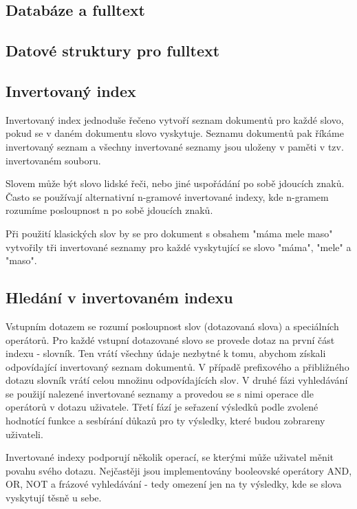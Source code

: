 \documentclass[11pt]{article}
\begin{document}
\subsection{Databáze a fulltext}
\subsection{Datové struktury pro fulltext}

\subsection{Invertovaný index}
Invertovaný index jednoduše řečeno vytvoří seznam dokumentů pro každé slovo,
pokud se v daném dokumentu slovo vyskytuje. Seznamu dokumentů pak říkáme
invertovaný seznam a všechny invertované seznamy jsou uloženy v paměti v tzv.
invertovaném souboru.

Slovem může být slovo lidské řeči, nebo jiné uspořádání po sobě jdoucích znaků.
Často se používají alternativní n-gramové invertované indexy, kde n-gramem
rozumíme posloupnost n po sobě jdoucích znaků.

Při použití klasických slov by se pro dokument s obsahem "máma mele maso"
vytvořily tři invertované seznamy pro každé vyskytující se slovo "máma", "mele"
a "maso".

\subsection{Hledání v invertovaném indexu}
Vstupním dotazem se rozumí posloupnost slov (dotazovaná slova) a speciálních
operátorů. Pro každé vstupní dotazované slovo se provede dotaz na první část
indexu - slovník. Ten vrátí všechny údaje nezbytné k tomu, abychom získali
odpovídající invertovaný seznam dokumentů. V případě prefixového a přibližného
dotazu slovník vrátí celou množinu odpovídajících slov.  V druhé fázi
vyhledávání se použijí nalezené invertované seznamy a provedou se s nimi
operace dle operátorů v dotazu uživatele. Třetí fází je seřazení výsledků podle
zvolené hodnotící funkce a sesbírání důkazů pro ty výsledky, které budou
zobrareny uživateli.

Invertované indexy podporují několik operací, se kterými může uživatel měnit
povahu svého dotazu. Nejčastěji jsou implementovány booleovské operátory AND,
OR, NOT a frázové vyhledávání - tedy omezení jen na ty výsledky, kde se slova
vyskytují těsně u sebe.
\end{document}
